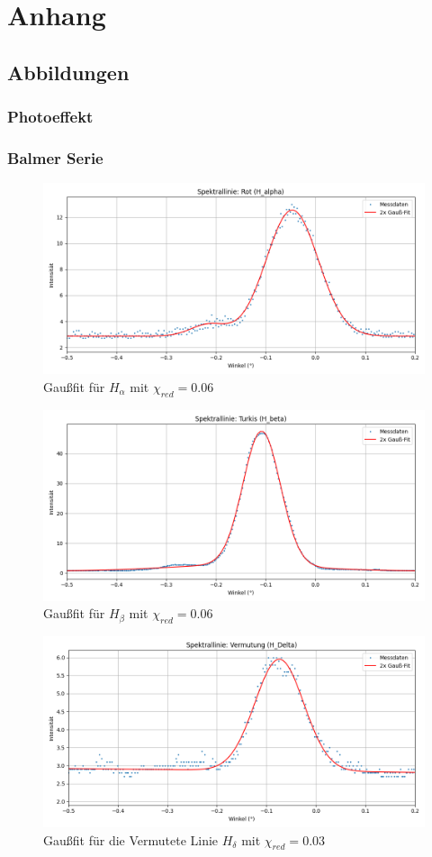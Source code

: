 \chapter{Anhang}
\section{Abbildungen}
\subsection*{Photoeffekt}
\subsection*{Balmer Serie}

\begin{figure}[H]
\centering
\includegraphics[width=0.7\linewidth]{figs/dt_rot_155_62.png}
\caption{Gaußfit für $H_\alpha$ mit $\chi_{red} = 0.06$}
\label{fig:H_a}
\end{figure}

\begin{figure}[H]
\centering
\includegraphics[width=0.7\linewidth]{figs/dt_turkis_145_55_5.png}
\caption{Gaußfit für $H_\beta$ mit $\chi_{red} = 0.06$}
\label{fig:H_b}
\end{figure}

\begin{figure}[H]
\centering
\includegraphics[width=0.7\linewidth]{figs/dt_vermutung_145_49.png}
\caption{Gaußfit für die Vermutete Linie $H_\delta$ mit $\chi_{red} = 0.03$}
\label{fig:H_d}
\end{figure}


